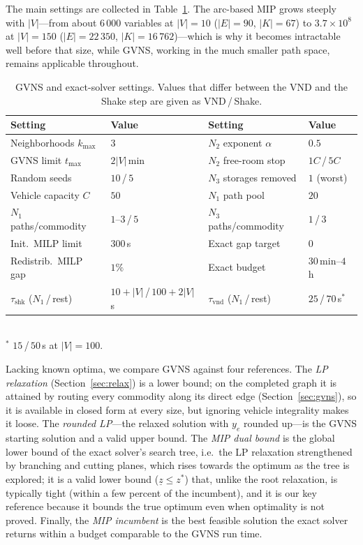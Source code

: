 \documentclass[runningheads]{llncs}
\begin{document}
The main settings are collected in Table~\ref{tab:params}. The arc-based MIP
grows steeply with $|V|$---from about $6\,000$ variables at $|V|=10$ ($|E|=90$,
$|K|=67$) to $3.7\times10^{8}$ at $|V|=150$ ($|E|=22\,350$, $|K|=16\,762$)---which
is why it becomes intractable well before that size, while GVNS, working in the
much smaller path space, remains applicable throughout.

\begin{table}[t]
\centering
\caption{GVNS and exact-solver settings. Values that differ between the VND and
the Shake step are given as VND\,/\,Shake.}
\label{tab:params}
\small
\setlength{\tabcolsep}{3pt}
\begin{tabular}{llll}
\toprule
Setting & Value & Setting & Value\\
\midrule
Neighborhoods $k_{\max}$ & $3$
  & $N_2$ exponent $\alpha$ & $0.5$\\
GVNS limit $t_{\max}$ & $2|V|$\,min
  & $N_2$ free-room stop & $1C$\,/\,$5C$\\
Random seeds & $10$\,/\,$5$
  & $N_3$ storages removed & $1$ (worst)\\
Vehicle capacity $C$ & $50$
  & $N_1$ path pool & $20$\\
$N_1$ paths/commodity & $1$--$3$\,/\,$5$
  & $N_3$ paths/commodity & $1$\,/\,$3$\\
Init.\ MILP limit & $300$\,s
  & Exact gap target & $0$\\
Redistrib.\ MILP gap & $1\%$
  & Exact budget & $30$\,min--$4$\,h\\
$\tau_{\mathrm{shk}}$ ($N_1$\,/\,rest) & $10{+}|V|$\,/\,$100{+}2|V|$\,s
  & $\tau_{\mathrm{vnd}}$ ($N_1$\,/\,rest) & $25$\,/\,$70$\,s$^{*}$\\
\bottomrule
\end{tabular}
\\[2pt]
{\footnotesize $^{*}$ $15$\,/\,$50$\,s at $|V|=100$.}
\end{table}

Lacking known optima, we compare GVNS against four references. The \emph{LP
relaxation} (Section~\ref{sec:relax}) is a lower bound; on the completed graph it
is attained by routing every commodity along its direct edge
(Section~\ref{sec:gvns}), so it is available in closed form at every size, but
ignoring vehicle integrality makes it loose. The \emph{rounded LP}---the relaxed
solution with $y_e$ rounded up---is the GVNS starting solution and a valid upper
bound. The \emph{MIP dual bound} is the global lower bound of the exact solver's
search tree, i.e.\ the LP relaxation strengthened by branching and cutting planes,
which rises towards the optimum as the tree is explored; it is a valid lower bound
($\underline{z}\le z^{\ast}$) that, unlike the root relaxation, is typically tight
(within a few percent of the incumbent), and it is our key reference because it
bounds the true optimum even when optimality is not proved. Finally, the \emph{MIP
incumbent} is the best feasible solution the exact solver returns within a budget
comparable to the GVNS run time.
\end{document}
